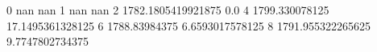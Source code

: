0 nan nan
1 nan nan
2 1782.1805419921875 0.0
4 1799.330078125 17.1495361328125
6 1788.83984375 6.6593017578125
8 1791.955322265625 9.7747802734375
